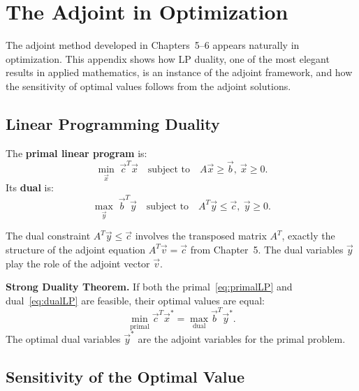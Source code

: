 
\chapter{The Adjoint in Optimization}
\label{app:optimization}

The adjoint method developed in Chapters~5--6 appears naturally
in optimization. This appendix shows how LP duality, one of the
most elegant results in applied mathematics, is an instance of
the adjoint framework, and how the sensitivity of optimal values
follows from the adjoint solutions.

\section{Linear Programming Duality}
\label{appsec:lpduality}

The \textbf{primal linear program} is:
\begin{equation}
  \min_{\vec{x}}\; \vec{c}^T\vec{x}
  \quad\text{subject to}\quad A\vec{x} \geq \vec{b},\ \vec{x} \geq 0.
  \label{eq:primalLP}
\end{equation}
Its \textbf{dual} is:
\begin{equation}
  \max_{\vec{y}}\; \vec{b}^T\vec{y}
  \quad\text{subject to}\quad A^T\vec{y} \leq \vec{c},\ \vec{y} \geq 0.
  \label{eq:dualLP}
\end{equation}

The dual constraint $A^T\vec{y} \leq \vec{c}$ involves the transposed
matrix $A^T$, exactly the structure of the adjoint equation
$A^T\vec{v} = \vec{c}$ from Chapter~5.
The dual variables $\vec{y}$ play the role of the adjoint vector $\vec{v}$.

\textbf{Strong Duality Theorem.}
If both the primal~\eqref{eq:primalLP} and dual~\eqref{eq:dualLP}
are feasible, their optimal values are equal:
\[
  \min_{\text{primal}} \vec{c}^T\vec{x}^* = \max_{\text{dual}} \vec{b}^T\vec{y}^*.
\]
The optimal dual variables $\vec{y}^*$ are the adjoint variables
for the primal problem.

\section{Sensitivity of the Optimal Value}
\label{appsec:LPsens}

